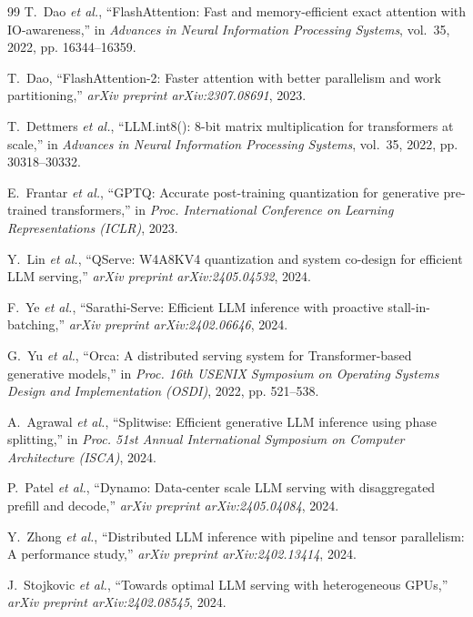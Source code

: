 \documentclass[10pt,journal]{IEEEtran}
\begin{document}
\begin{thebibliography}{99}
T.~Dao \emph{et al.}, ``FlashAttention: Fast and memory-efficient exact attention with IO-awareness,''
in \emph{Advances in Neural Information Processing Systems}, vol.~35, 2022, pp. 16344--16359.

T.~Dao, ``FlashAttention-2: Faster attention with better parallelism and work partitioning,''
\emph{arXiv preprint arXiv:2307.08691}, 2023.

T.~Dettmers \emph{et al.}, ``LLM.int8(): 8-bit matrix multiplication for transformers at scale,''
in \emph{Advances in Neural Information Processing Systems}, vol.~35, 2022, pp. 30318--30332.

E.~Frantar \emph{et al.}, ``GPTQ: Accurate post-training quantization for generative pre-trained transformers,''
in \emph{Proc. International Conference on Learning Representations (ICLR)}, 2023.

Y.~Lin \emph{et al.}, ``QServe: W4A8KV4 quantization and system co-design for efficient LLM serving,''
\emph{arXiv preprint arXiv:2405.04532}, 2024.

F.~Ye \emph{et al.}, ``Sarathi-Serve: Efficient LLM inference with proactive stall-in-batching,''
\emph{arXiv preprint arXiv:2402.06646}, 2024.

G.~Yu \emph{et al.}, ``Orca: A distributed serving system for Transformer-based generative models,''
in \emph{Proc. 16th USENIX Symposium on Operating Systems Design and Implementation (OSDI)}, 2022, pp. 521--538.

A.~Agrawal \emph{et al.}, ``Splitwise: Efficient generative LLM inference using phase splitting,''
in \emph{Proc. 51st Annual International Symposium on Computer Architecture (ISCA)}, 2024.

P.~Patel \emph{et al.}, ``Dynamo: Data-center scale LLM serving with disaggregated prefill and decode,''
\emph{arXiv preprint arXiv:2405.04084}, 2024.

Y.~Zhong \emph{et al.}, ``Distributed LLM inference with pipeline and tensor parallelism: A performance study,''
\emph{arXiv preprint arXiv:2402.13414}, 2024.

J.~Stojkovic \emph{et al.}, ``Towards optimal LLM serving with heterogeneous GPUs,''
\emph{arXiv preprint arXiv:2402.08545}, 2024.

\end{thebibliography}
\end{document}
